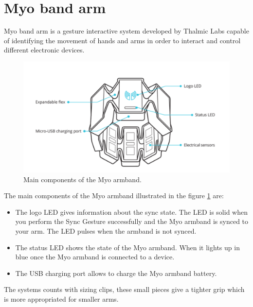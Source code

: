 \section{Myo band arm}

Myo band arm is a gesture interactive system developed by Thalmic Labs capable of identifying the movement of hands and arms in order to interact and control different electronic devices.

\begin{figure}[H]                    
	\includegraphics[width=.5\textwidth]{figures/myob/armband}  %
	\caption{Main components of the Myo armband. \cite{}}
	\label{fig:armband}  %
\end{figure}


The main components of the Myo armband illustrated in the figure \ref{fig:armband} are:
\begin{itemize}
\item The logo LED gives information about the sync state. The LED is solid when you perform the Sync Gesture successfully and
the Myo armband is synced to your arm. The LED pulses when the armband is not synced.
\item The status LED shows the state of the Myo armband. When it lights up in blue once the Myo armband is connected to a device. 
\item The USB charging port allows to charge the Myo armband battery. 
\end{itemize}
The systems counts with sizing clips, these small pieces give a tighter grip which is more appropriated for smaller arms.

